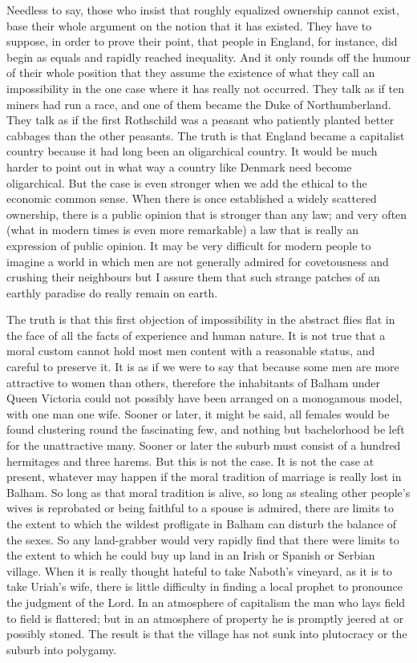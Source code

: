 \documentclass{book}
\begin{document}
Needless to say, those who insist that roughly equalized ownership cannot exist, base their whole argument on the notion that it has existed. They have to suppose, in order to prove their point, that people in England, for instance, did begin as equals and rapidly reached inequality. And it only rounds off the humour of their whole position that they assume the existence of what they call an impossibility in the one case where it has really not occurred. They talk as if ten miners had run a race, and one of them became the Duke of Northumberland. They talk as if the first Rothschild was a peasant who patiently planted better cabbages than the other peasants. The truth is that England became a capitalist country because it had long been an oligarchical country. It would be much harder to point out in what way a country like Denmark need become oligarchical. But the case is even stronger when we add the ethical to the economic common sense. When there is once established a widely scattered ownership, there is a public opinion that is stronger than any law; and very often (what in modern times is even more remarkable) a law that is really an expression of public opinion. It may be very difficult for modern people to imagine a world in which men are not generally admired for covetousness and crushing their neighbours but I assure them that such strange patches of an earthly paradise do really remain on earth.

The truth is that this first objection of impossibility in the abstract flies flat in the face of all the facts of experience and human nature. It is not true that a moral custom cannot hold most men content with a reasonable status, and careful to preserve it. It is as if we were to say that because some men are more attractive to women than others, therefore the inhabitants of Balham under Queen Victoria could not possibly have been arranged on a monogamous model, with one man one wife. Sooner or later, it might be said, all females would be found clustering round the fascinating few, and nothing but bachelorhood be left for the unattractive many. Sooner or later the suburb must consist of a hundred hermitages and three harems. But this is not the case. It is not the case at present, whatever may happen if the moral tradition of marriage is really lost in Balham. So long as that moral tradition is alive, so long as stealing other people’s wives is reprobated or being faithful to a spouse is admired, there are limits to the extent to which the wildest profligate in Balham can disturb the balance of the sexes. So any land-grabber would very rapidly find that there were limits to the extent to which he could buy up land in an Irish or Spanish or Serbian village. When it is really thought hateful to take Naboth’s vineyard, as it is to take Uriah’s wife, there is little difficulty in finding a local prophet to pronounce the judgment of the Lord. In an atmosphere of capitalism the man who lays field to field is flattered; but in an atmosphere of property he is promptly jeered at or possibly stoned. The result is that the village has not sunk into plutocracy or the suburb into polygamy.
\end{document}

